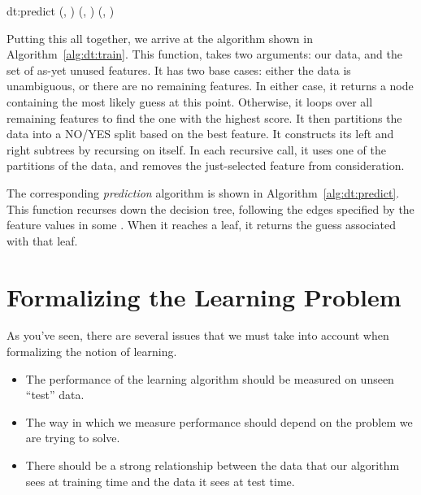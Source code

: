 \newalgorithm%
  {dt:predict}%
  {(, )}
  {
\RETURN {}
\RETURN {}(, )
\ELSE
\RETURN {}(, )
\ENDIF
\ENDIF
}

Putting this all together, we arrive at the algorithm shown in
Algorithm~\ref{alg:dt:train}.  This function,
 takes two arguments: our data, and the set of
as-yet unused features.  It has two base cases: either the data is
unambiguous, or there are no remaining features.  In either case, it
returns a  node containing the most likely guess at this
point.  Otherwise, it loops over all remaining features to find the
one with the highest score.  It then partitions the data into a NO/YES
split based on the best feature.  It constructs its left and right
subtrees by recursing on itself.  In each recursive call, it uses one
of the partitions of the data, and removes the just-selected feature
from consideration.


The corresponding \emph{prediction} algorithm is shown in
Algorithm~\ref{alg:dt:predict}.  This function recurses down the decision
tree, following the edges specified by the feature values in some
.  When it reaches a leaf, it returns the guess
associated with that leaf.

\section{Formalizing the Learning Problem}

As you've seen, there are several issues that we must take into
account when formalizing the notion of learning.

\begin{itemize}
\item The performance of the learning algorithm should be measured on
  unseen ``test'' data.

\item The way in which we measure performance should depend on the
  problem we are trying to solve.

\item There should be a strong relationship between the data that our
  algorithm sees at training time and the data it sees at test time.
\end{itemize}

